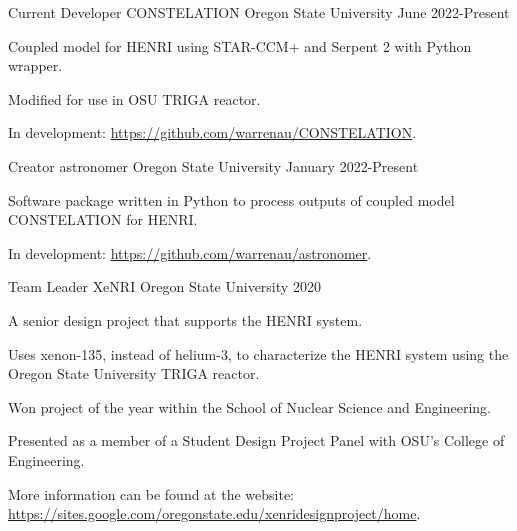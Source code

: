 
\begin{cventries}
  \cventry
    {Current Developer}      %
    {CONSTELATION}           %
    {Oregon State University}%
    {June 2022-Present}   %
    {
    \begin{cvitems}
        \item{Coupled model for HENRI using STAR-CCM+ and Serpent 2 with Python wrapper.}
        \item{Modified for use in OSU TRIGA reactor.}
        \item{In development: \href{https://github.com/warrenau/CONSTELATION/tree/ostr}{https://github.com/warrenau/CONSTELATION}.}
    \end{cvitems}
    }


  \cventry
    {Creator}                %
    {astronomer}             %
    {Oregon State University}%
    {January 2022-Present}   %
    {
    \begin{cvitems}
        \item{Software package written in Python to process outputs of coupled model CONSTELATION for HENRI.}
        \item{In development: \href{https://github.com/warrenau/astronomer}{https://github.com/warrenau/astronomer}.}
    \end{cvitems}
    }

  
  \cventry
    {Team Leader} %
    {XeNRI} %
    {Oregon State University} %
    {2020} %
    {
      \begin{cvitems} %
        \item{A senior design project that supports the HENRI system.}
		\item {Uses xenon-135, instead of helium-3, to characterize the HENRI system using the Oregon State University TRIGA reactor.}
		\item {Won project of the year within the School of Nuclear Science and Engineering.}
		\item{Presented as a member of a Student Design Project Panel with OSU's College of Engineering.}
        \item{More information can be found at the website: \href{https://sites.google.com/oregonstate.edu/xenridesignproject/home}{https://sites.google.com/oregonstate.edu/xenridesignproject/home}.}
      \end{cvitems}
    }


\end{cventries}